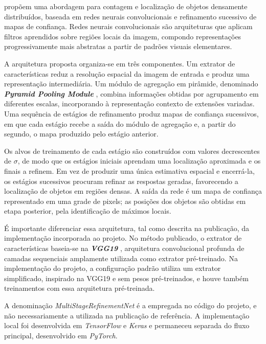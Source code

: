 \citet{arruda2022} prop\~oem uma abordagem para contagem e localiza\c{c}\~ao de objetos densamente distribu\'idos, baseada em redes neurais convolucionais e refinamento sucessivo de mapas de confian\c{c}a. Redes neurais convolucionais s\~ao arquiteturas que aplicam filtros aprendidos sobre regi\~oes locais da imagem, compondo representa\c{c}\~oes progressivamente mais abstratas a partir de padr\~oes visuais elementares.

A arquitetura proposta organiza-se em tr\^es componentes. Um extrator de caracter\'isticas reduz a resolu\c{c}\~ao espacial da imagem de entrada e produz uma representa\c{c}\~ao intermedi\'aria. Um m\'odulo de agrega\c{c}\~ao em pir\^amide, denominado \textit{\textbf{Pyramid Pooling Module}} \citep{zhao2017}, combina informa\c{c}\~oes obtidas por agrupamento em diferentes escalas, incorporando \`a representa\c{c}\~ao contexto de extens\~oes variadas. Uma sequ\^encia de est\'agios de refinamento produz mapas de confian\c{c}a sucessivos, em que cada est\'agio recebe a sa\'ida do m\'odulo de agrega\c{c}\~ao e, a partir do segundo, o mapa produzido pelo est\'agio anterior.

Os alvos de treinamento de cada est\'agio s\~ao constru\'idos com valores decrescentes de $\sigma$, de modo que os est\'agios iniciais aprendam uma localiza\c{c}\~ao aproximada e os finais a refinem. Em vez de produzir uma \'unica estimativa espacial e encerr\'a-la, os est\'agios sucessivos procuram refinar as respostas geradas, favorecendo a localiza\c{c}\~ao de objetos em regi\~oes densas. A sa\'ida da rede \'e um mapa de confian\c{c}a representado em uma grade de pixels; as posi\c{c}\~oes dos objetos s\~ao obtidas em etapa posterior, pela identifica\c{c}\~ao de m\'aximos locais.

\'E importante diferenciar essa arquitetura, tal como descrita na publica\c{c}\~ao, da implementa\c{c}\~ao incorporada ao projeto. No m\'etodo publicado, o extrator de caracter\'isticas baseia-se na \textit{\textbf{VGG19}} \citep{simonyan2015}, arquitetura convolucional profunda de camadas sequenciais amplamente utilizada como extrator pr\'e-treinado. Na implementa\c{c}\~ao do projeto, a configura\c{c}\~ao padr\~ao utiliza um extrator simplificado, inspirado na VGG19 e sem pesos pr\'e-treinados, e houve tamb\'em treinamentos com essa arquitetura pr\'e-treinada.

A denomina\c{c}\~ao \textit{MultiStageRefinementNet} \'e a empregada no c\'odigo do projeto, e n\~ao necessariamente a utilizada na publica\c{c}\~ao de refer\^encia. A implementa\c{c}\~ao local foi desenvolvida em \textit{TensorFlow} e \textit{Keras} e permaneceu separada do fluxo principal, desenvolvido em \textit{PyTorch}.


